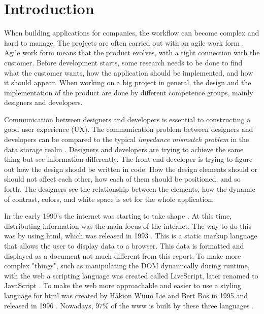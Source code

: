 \section{Introduction}



When building applications for companies, the workflow can become complex and hard to manage. The projects are often carried out with an agile work form \cite{cohen2004introduction}. Agile work form means that the product evolves, with a tight connection with the customer. Before development starts, some research needs to be done to find what the customer wants, how the application should be implemented, and how it should appear. When working on a big project in general, the design and the implementation of the product are done by different competence groups, mainly designers and developers. 

Communication between designers and developers is essential to constructing a good user experience (UX). The communication problem between designers and developers can be compared to the typical \textit{impedance mismatch problem} in the data storage realm \cite{irelandClassificationObjectRelationalImpedance2009}. Designers and developers are trying to achieve the same thing but see information differently. The front-end developer is trying to figure out how the design should be written in code. How the design elements should or should not affect each other, how each of them should be positioned, and so forth. The designers see the relationship between the elements, how the dynamic of contrast, colors, and white space is set for the whole application. 

In the early 1990's the internet was starting to take shape \cite{WebD2BriefHistory}. At this time, distributing information was the main focus of the internet. The way to do this was by using \acrfull{html}, which was released in 1993 \cite{WebD2BriefHistory}. This is a static markup language that allows the user to display data to a browser. This data is formatted and displayed as a document not much different from this report. To make more complex "things", such as manipulating the DOM dynamically during runtime, with the web a scripting language was created called LiveScript, later renamed to JavaScript \cite{JavaScript2021}. To make the web more approachable and easier to use a styling language for \acrshort{html} was created by Håkion Wium Lie and Bert Bos in 1995 and released in 1996 \cite{BriefHistoryCSS}. Nowadays, 97\% of the \acrlong{www} is built by these three languages \cite{JavaScript2021}.

